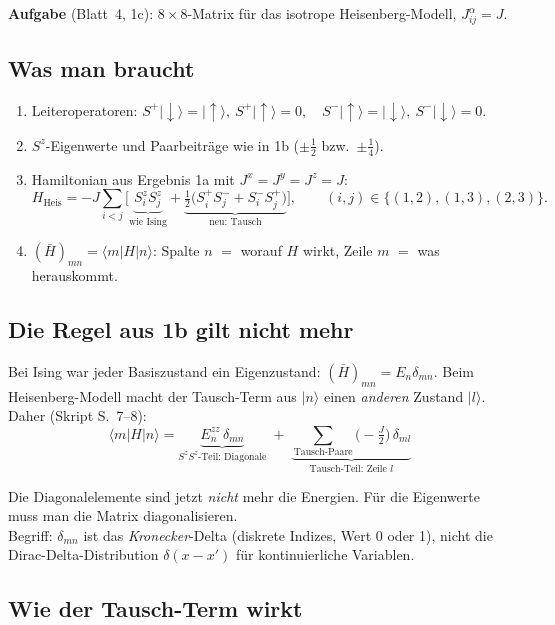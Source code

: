 \documentclass[11pt,a4paper]{article}
\newcommand{\ket}[1]{\lvert #1\rangle}
\newcommand{\bra}[1]{\langle #1\rvert}
\newcommand{\up}{{\uparrow}}
\newcommand{\dn}{{\downarrow}}
\newcommand{\Hbar}{\bar H}
\begin{document}
\textbf{Aufgabe} (Blatt~4, 1c): $8\times8$-Matrix für das isotrope Heisenberg-Modell, $J^\alpha_{ij} = J$.

\subsection{Was man braucht}
\begin{enumerate}[itemsep=2pt]
\item Leiteroperatoren: $S^+\ket\dn = \ket\up,\ S^+\ket\up = 0,\quad S^-\ket\up = \ket\dn,\ S^-\ket\dn = 0$.
\item $S^z$-Eigenwerte und Paarbeiträge wie in 1b ($\pm\tfrac12$ bzw.\ $\pm\tfrac14$).
\item Hamiltonian aus Ergebnis 1a mit $J^x=J^y=J^z=J$:
\[
H_\text{Heis} = -J\sum_{i<j}\Big[\underbrace{S^z_iS^z_j}_{\text{wie Ising}} + \underbrace{\tfrac12\big(S^+_iS^-_j + S^-_iS^+_j\big)}_{\text{neu: Tausch}}\Big],
\qquad (i,j)\in\{(1,2),(1,3),(2,3)\}.
\]
\item $(\Hbar)_{mn} = \bra mH\ket n$: Spalte $n$ $=$ worauf $H$ wirkt, Zeile $m$ $=$ was herauskommt.
\end{enumerate}

\subsection{Die Regel aus 1b gilt nicht mehr}

Bei Ising war jeder Basiszustand ein Eigenzustand: $(\Hbar)_{mn} = E_n\delta_{mn}$. Beim Heisenberg-Modell macht der Tausch-Term aus $\ket n$ einen \emph{anderen} Zustand $\ket l$. Daher (Skript S.~7--8):
\[
\bra mH\ket n = \underbrace{E^{zz}_n\,\delta_{mn}}_{S^zS^z\text{-Teil: Diagonale}} \;+\; \underbrace{\sum_{\text{Tausch-Paare}} \big(-\tfrac J2\big)\,\delta_{ml}}_{\text{Tausch-Teil: Zeile } l}
\]

\begin{falle}
Die Diagonalelemente sind jetzt \emph{nicht} mehr die Energien. Für die Eigenwerte muss man die Matrix diagonalisieren. \\
Begriff: $\delta_{mn}$ ist das \emph{Kronecker}-Delta (diskrete Indizes, Wert 0 oder 1), nicht die Dirac-Delta-Distribution $\delta(x-x')$ für kontinuierliche Variablen.
\end{falle}

\subsection{Wie der Tausch-Term wirkt}
\end{document}
